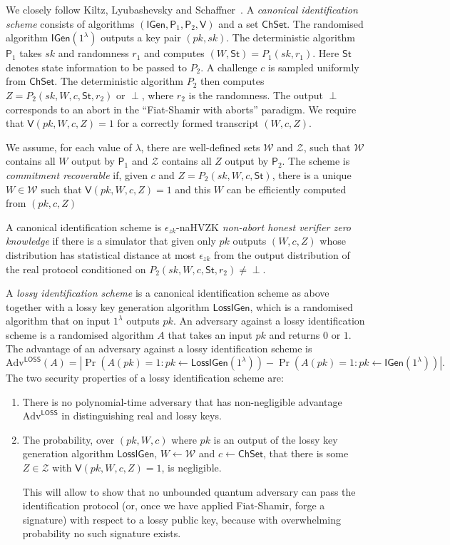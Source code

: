 \documentclass{llncs}
\newcommand{\Adv}{\text{Adv}}
\newcommand{\IGen}{\textsf{IGen}}
\newcommand{\PP}{\textsf{P}}
\newcommand{\VV}{\textsf{V}}
\newcommand{\Wset}{\mathcal{W}}
\newcommand{\Zset}{\mathcal{Z}}
\newcommand{\ChSet}{\textsf{ChSet}}
\newcommand{\St}{\textsf{St}}
\newcommand{\LossIGen}{\textsf{LossIGen}}
\begin{document}
We closely follow Kiltz, Lyubashevsky and Schaffner~\cite{KLS18}.
A \emph{canonical identification scheme} consists of algorithms $(\IGen, \PP_1, \PP_2, \VV)$ and a set $\ChSet$. The randomised algorithm $\IGen( 1^\lambda )$ outputs a key pair $(pk,sk)$.
The deterministic algorithm $\PP_1$ takes $sk$ and randomness $r_1$ and computes $(W, \St) = P_1( sk, r_1 )$. 
Here $\St$ denotes state information to be passed to $P_2$.
A challenge $c$ is sampled uniformly from $\ChSet$. The deterministic algorithm $P_2$ then computes $Z = P_2( sk, W, c, \St, r_2 )$ or $\perp$, where $r_2$ is the randomness.
The output $\perp$ corresponds to an abort in the ``Fiat-Shamir with aborts'' paradigm.
We require that $\VV( pk, W, c, Z ) = 1$ for a correctly formed transcript $(W,c,Z)$.

We assume, for each value of $\lambda$, there are well-defined sets $\Wset$ and $\Zset$, such that $\Wset$ contains all $W$ output by $\PP_1$ and $\Zset$ contains all $Z$ output by $\PP_2$. 
The scheme is \emph{commitment recoverable} if, given $c$ and $Z = P_2( sk, W, c, \St )$, there is a unique $W \in \Wset$ such that $\VV( pk, W, c, Z ) = 1$ and this $W$ can be efficiently computed from $(pk, c, Z)$

A canonical identification scheme is $\epsilon_{zk}$-naHVZK \emph{non-abort honest verifier zero knowledge} if there is a simulator that given only $pk$ outputs $(W, c, Z)$ whose distribution has statistical distance at most $\epsilon_{zk}$ from the output distribution of the real protocol conditioned on $P_2( sk, W, c, \St, r_2 ) \ne \perp$.


A \emph{lossy identification scheme} is a canonical identification scheme as above together with a lossy key generation algorithm $\LossIGen$, which is a randomised algorithm that on input $1^\lambda$ outputs $pk$.
An adversary against a lossy identification scheme is a randomised algorithm $A$ that takes an input $pk$ and returns $0$ or $1$.
The advantage of an adversary against a lossy identification scheme is 
\[
   \Adv^{\textsf{LOSS}}(A) = \left|
   \Pr\left( A( pk ) = 1 : pk \leftarrow \LossIGen(1^\lambda) \right) - \Pr\left( A( pk ) = 1 : pk \leftarrow \IGen( 1^\lambda ) \right) \right|.
\]
The two security properties of a lossy identification scheme are:
\begin{enumerate}
\item There is no polynomial-time adversary that has non-negligible advantage $\Adv^{\textsf{LOSS}}$ in distinguishing real and lossy keys.
\item The probability, over $(pk, W, c)$ where $pk$ is an output of the lossy key generation algorithm $\LossIGen$, $W \leftarrow \Wset$ and $c \leftarrow \ChSet$, that there is some $Z \in \Zset$ with $\VV( pk, W, c, Z ) = 1$, is negligible.

This will allow to show that no unbounded quantum adversary can pass the identification protocol (or, once we have applied Fiat-Shamir, forge a signature) with respect to a lossy public key, because with overwhelming probability no such signature exists.
\end{enumerate}
\end{document}

